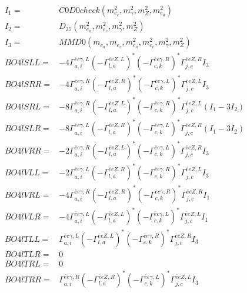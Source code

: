 \documentclass[A4,landscape]{article}
\begin{document}
\begin{align} 
I_1 = & C0D0check(m^2_{e_{{c}}}, m^2_{\gamma}, m^2_{Z}, m^2_{e_{{a}}}) \\ 
I_2 = & D_{27}(m^2_{e_{{a}}}, m^2_{e_{{c}}}, m^2_{\gamma}, m^2_{Z}) \\ 
I_3 = & MMD0(m_{e_{{a}}}, m_{e_{{c}}}, m^2_{e_{{a}}}, m^2_{e_{{c}}}, m^2_{\gamma}, m^2_{Z}) \\ 
  BO4lSLL= & -4  \Gamma^{\bar{e}e \gamma ,L}_{a, i} (- \Gamma^{\bar{e}e Z ,L} _{l, a})^* (- \Gamma^{\bar{e}e \gamma ,R} _{c, k})^* \Gamma^{\bar{e}e Z ,R}_{j, c} I_3 \\ 
  BO4lSRR= & -4  \Gamma^{\bar{e}e \gamma ,R}_{a, i} (- \Gamma^{\bar{e}e Z ,R} _{l, a})^* (- \Gamma^{\bar{e}e \gamma ,L} _{c, k})^* \Gamma^{\bar{e}e Z ,L}_{j, c} I_3 \\ 
  BO4lSRL= & -8  \Gamma^{\bar{e}e \gamma ,R}_{a, i} (- \Gamma^{\bar{e}e Z ,L} _{l, a})^* (- \Gamma^{\bar{e}e \gamma ,R} _{c, k})^* \Gamma^{\bar{e}e Z ,L}_{j, c} (I_1 - 3 I_2) \\ 
  BO4lSLR= & -8  \Gamma^{\bar{e}e \gamma ,L}_{a, i} (- \Gamma^{\bar{e}e Z ,R} _{l, a})^* (- \Gamma^{\bar{e}e \gamma ,L} _{c, k})^* \Gamma^{\bar{e}e Z ,R}_{j, c} (I_1 - 3 I_2) \\ 
  BO4lVRR= & -2  \Gamma^{\bar{e}e \gamma ,R}_{a, i} (- \Gamma^{\bar{e}e Z ,L} _{l, a})^* (- \Gamma^{\bar{e}e \gamma ,L} _{c, k})^* \Gamma^{\bar{e}e Z ,R}_{j, c} I_3 \\ 
  BO4lVLL= & -2  \Gamma^{\bar{e}e \gamma ,L}_{a, i} (- \Gamma^{\bar{e}e Z ,R} _{l, a})^* (- \Gamma^{\bar{e}e \gamma ,R} _{c, k})^* \Gamma^{\bar{e}e Z ,L}_{j, c} I_3 \\ 
  BO4lVRL= & -4  \Gamma^{\bar{e}e \gamma ,R}_{a, i} (- \Gamma^{\bar{e}e Z ,R} _{l, a})^* (- \Gamma^{\bar{e}e \gamma ,R} _{c, k})^* \Gamma^{\bar{e}e Z ,R}_{j, c} I_1 \\ 
  BO4lVLR= & -4  \Gamma^{\bar{e}e \gamma ,L}_{a, i} (- \Gamma^{\bar{e}e Z ,L} _{l, a})^* (- \Gamma^{\bar{e}e \gamma ,L} _{c, k})^* \Gamma^{\bar{e}e Z ,L}_{j, c} I_1 \\ 
  BO4lTLL= &  \Gamma^{\bar{e}e \gamma ,L}_{a, i} (- \Gamma^{\bar{e}e Z ,L} _{l, a})^* (- \Gamma^{\bar{e}e \gamma ,R} _{c, k})^* \Gamma^{\bar{e}e Z ,R}_{j, c} I_3 \\ 
  BO4lTLR= & 0 \\ 
  BO4lTRL= & 0 \\ 
  BO4lTRR= &  \Gamma^{\bar{e}e \gamma ,R}_{a, i} (- \Gamma^{\bar{e}e Z ,R} _{l, a})^* (- \Gamma^{\bar{e}e \gamma ,L} _{c, k})^* \Gamma^{\bar{e}e Z ,L}_{j, c} I_3 \\ 
\end{align} 
\end{document}
